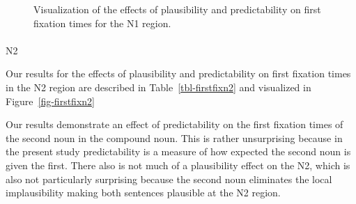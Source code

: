 \documentclass[
  12pt,
  letterpaper,
]{scrreprt}
\makeatletter
\let\oldparagraph\paragraph
\renewcommand{\paragraph}{
    \@ifstar
      \xxxParagraphStar
      \xxxParagraphNoStar
  }
\newcommand{\xxxParagraphStar}[1]{\oldparagraph*{#1}\mbox{}}
\newcommand{\xxxParagraphNoStar}[1]{\oldparagraph{#1}\mbox{}}
\makeatother
\begin{document}
\begin{figure}[htbp]

\caption{\label{fig-firstfixn1}Visualization of the effects of
plausibility and predictability on first fixation times for the N1
region.}


\end{figure}%

\paragraph{N2}\label{n2-4}

Our results for the effects of plausibility and predictability on first
fixation times in the N2 region are described in
Table~\ref{tbl-firstfixn2} and visualized in Figure~\ref{fig-firstfixn2}

Our results demonstrate an effect of predictability on the first
fixation times of the second noun in the compound noun. This is rather
unsurprising because in the present study predictability is a measure of
how expected the second noun is given the first. There also is not much
of a plausibility effect on the N2, which is also not particularly
surprising because the second noun eliminates the local implausibility
making both sentences plausible at the N2 region.
\end{document}
